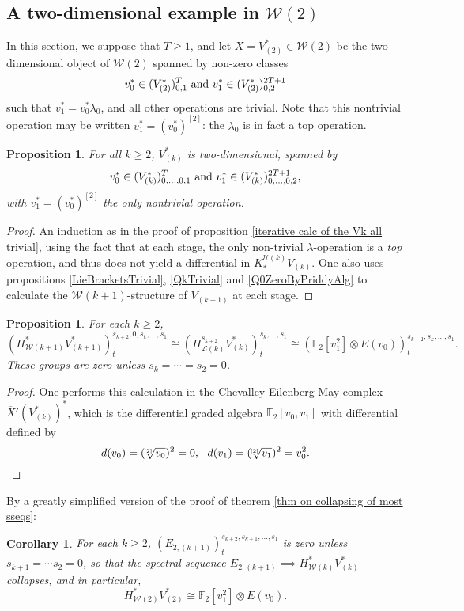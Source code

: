 \documentclass[11pt]{amsart}
\theoremstyle{plain}
\newtheorem{prop}[thm]{Proposition}
\newtheorem{cor}[thm]{Corollary}
\theoremstyle{definition}
\newcommand{\calW}{\mathcal{W}}
\newcommand{\calU}{\mathcal{U}}
\newcommand{\calL}{\mathcal{L}}
\theoremstyle{plain}
\newcommand{\restn}[1]{#1^{[2]}}
\newcommand{\dualrestn}[1]{\sqrt[{[2]}]{#1}}
\renewcommand{\dualrestn}[1]{\sqrt[{\!\!\![2]}]{#1}}
\newcommand{\UEAX}{\overline{X}'}%
\newcommand{\F}{\mathbb{F}}
\begin{document}
\begin{Calculations of HWn for n nonzero}
\subsection{A two-dimensional example in $\calW(2)$}
In this section, we suppose that $T\geq1$, and let $X=V^*_{(2)}\in\calW(2)$ be the two-dimensional object of $\calW(2)$ spanned by non-zero classes 
\[v_{0}^{*}\in (V^*_{(2)})^{T}_{0,1}\textup{ and }v_{1}^{*}\in (V^*_{(2)})^{2T+1}_{0,2}\]
such that $v_{1}^*=v^*_0\lambda_{0}$, and all other operations are trivial. Note that this nontrivial operation may be written $v_{1}^*=\restn{(v^*_0)}$: the $\lambda_0$ is in fact a top operation.
\begin{prop}\label{2d example in w2}
For all $k\geq2$, $V_{(k)}^{*}$ is two-dimensional, spanned by
\[v_{0}^{*}\in (V^*_{(k)})^{T}_{0,\ldots,0,1}\textup{ and }v_{1}^{*}\in (V^*_{(k)})^{2T+1}_{0,\ldots,0,2},\]
with  $v_{1}^*=\restn{(v^*_0)}$ the only nontrivial operation.
\end{prop}
\begin{proof}
An induction as in the proof of proposition \ref{iterative calc of the Vk all trivial}, using the fact that at each stage, the only non-trivial $\lambda$-operation is a \emph{top} operation, and thus does not yield a differential in $K_*^{\calU(k)}V_{(k)}$. One also uses propositions \ref{LieBracketsTrivial}, \ref{QkTrivial} and \ref{Q0ZeroByPriddyAlg} to calculate the $\calW(k+1)$-structure of $V_{(k+1)}$ at each stage.
\end{proof}
\begin{prop}
For each $k\geq2$,
\[(H^*_{\calW(k+1)}V^*_{(k+1)})^{s_{k+2},0,s_k,\ldots,s_1}_{t}\cong (H^{s_{k+2}}_{\calL(k)}V^*_{(k)})^{s_k,\ldots,s_1}_t\cong (\F_2[v_1^{2}]\otimes E(v_0))_t^{s_{k+2},s_{k},\ldots,s_1}.\]
These groups are zero unless $s_k=\cdots =s_2=0$.
\end{prop}
\begin{proof}
One performs this calculation in the Chevalley-Eilenberg-May complex $\UEAX(V_{(k)}^*)^*$, which is the differential graded algebra $\F_2[v_0,v_1]$ with differential defined by
\[d(v_0)=(\dualrestn{v_0})^2=0,\ \ d(v_1)=(\dualrestn{v_1})^2=v_0^2.\qedhere\]
\end{proof}
By a greatly simplified version of the proof of theorem \ref{thm on collapsing of most sseqs}:
\begin{cor}\label{statement of result on 2d w2 example}
For each $k\geq2$, $(E_{2,(k+1)})^{s_{k+2},s_{k+1},\ldots,s_1}_{t}$ is zero unless $s_{k+1}=\cdots s_2=0$, so that the spectral sequence $E_{2,(k+1)}\implies H^{*}_{\calW(k)}V^*_{(k)}$ collapses, and in particular,
\[H^*_{\calW(2)}V_{(2)}^*\cong \F_2[v_1^{2}]\otimes E(v_0).\]
\end{cor}


\end{Calculations of HWn for n nonzero}
\end{document}
